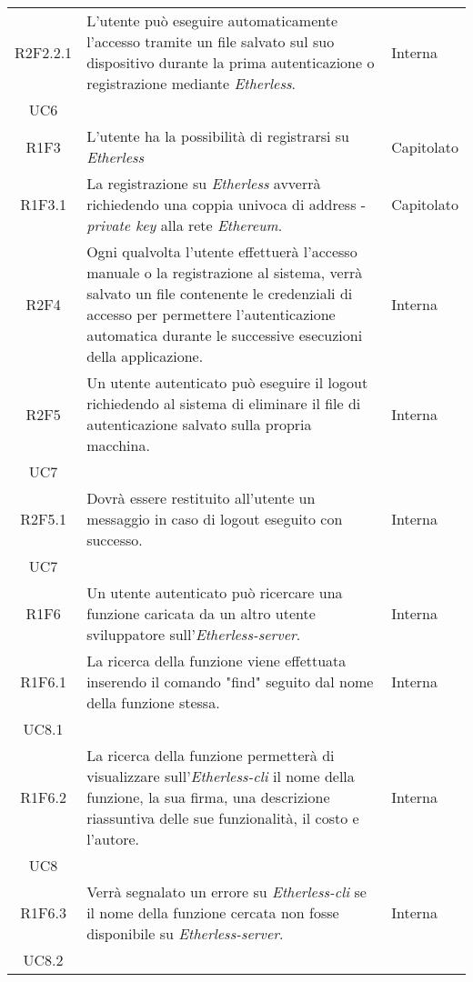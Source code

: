 \begin{longtable}{|c|p{8cm}|C{2cm}|}
	R2F2.2.1 &  L'utente può eseguire automaticamente l'accesso tramite un file salvato sul suo dispositivo durante la prima autenticazione o registrazione mediante \textit{Etherless}.  & \centering Interna \\ UC6 \tabularnewline
	
	R1F3 &  L'utente ha la possibilità di registrarsi su \textit{Etherless}  & Capitolato \\

	R1F3.1 &  La registrazione su \textit{Etherless} avverrà richiedendo una coppia univoca di address - \textit{private key\glo} alla rete \textit{Ethereum\glos}.  & Capitolato \\	
	
	R2F4 &  Ogni qualvolta l'utente effettuerà l'accesso manuale o la registrazione al sistema, verrà salvato un file contenente le credenziali di accesso per permettere l'autenticazione automatica durante le successive esecuzioni della applicazione.  & Interna \\
	
	R2F5 &  Un utente autenticato può eseguire il logout richiedendo al sistema di eliminare il file di autenticazione salvato sulla propria macchina.  & \centering Interna \\ UC7 \tabularnewline
	
	R2F5.1 &  Dovrà essere restituito all'utente un messaggio in caso di logout eseguito con successo.  & \centering Interna \\ UC7 \tabularnewline
	
	R1F6 &  Un utente autenticato può ricercare una funzione caricata da un altro utente sviluppatore sull'\textit{Etherless-server}.  & Interna \\
	
	R1F6.1 &  La ricerca della funzione viene effettuata inserendo il comando "find" seguito dal nome della funzione stessa. & \centering Interna \\ UC8.1 \tabularnewline
	
	R1F6.2 &  La ricerca della funzione permetterà di visualizzare sull'\textit{Etherless-cli} il nome della funzione, la sua firma, una descrizione riassuntiva delle sue funzionalità, il costo e l'autore.  & \centering Interna \\ UC8 \tabularnewline
	
	R1F6.3 &  Verrà segnalato un errore su \textit{Etherless-cli} se il nome della funzione cercata non fosse disponibile su \textit{Etherless-server}.  & \centering Interna \\ UC8.2 \tabularnewline
	

\end{longtable}
